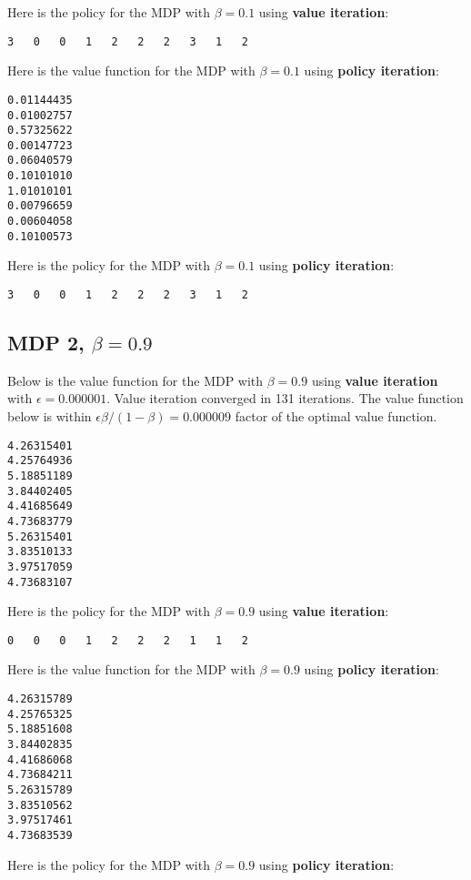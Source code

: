 \documentclass[paper=a4, fontsize=11pt]{scrartcl}
\begin{document}
Here is the policy for the MDP with $\beta = 0.1$ using \textbf{value iteration}:

\begin{verbatim}
3	0	0	1	2	2	2	3	1	2
\end{verbatim}

Here is the value function for the MDP with $\beta = 0.1$ using \textbf{policy iteration}:

\begin{verbatim}
0.01144435
0.01002757
0.57325622
0.00147723
0.06040579
0.10101010
1.01010101
0.00796659
0.00604058
0.10100573
\end{verbatim}

Here is the policy for the MDP with $\beta = 0.1$ using \textbf{policy iteration}:

\begin{verbatim}
3	0	0	1	2	2	2	3	1	2
\end{verbatim}

\subsection{MDP 2, $\beta = 0.9$}

Below is the value function for the MDP with $\beta = 0.9$ using \textbf{value iteration} with $\epsilon = 0.000001$. Value iteration converged in 131 iterations. The value function below is within $\epsilon \beta / (1 - \beta) = 0.000009$ factor of the optimal value function.

\begin{verbatim}
4.26315401
4.25764936
5.18851189
3.84402405
4.41685649
4.73683779
5.26315401
3.83510133
3.97517059
4.73683107
\end{verbatim}

Here is the policy for the MDP with $\beta = 0.9$ using \textbf{value iteration}:

\begin{verbatim}
0	0	0	1	2	2	2	1	1	2
\end{verbatim}

Here is the value function for the MDP with $\beta = 0.9$ using \textbf{policy iteration}:

\begin{verbatim}
4.26315789
4.25765325
5.18851608
3.84402835
4.41686068
4.73684211
5.26315789
3.83510562
3.97517461
4.73683539
\end{verbatim}

Here is the policy for the MDP with $\beta = 0.9$ using \textbf{policy iteration}:
\end{document}
